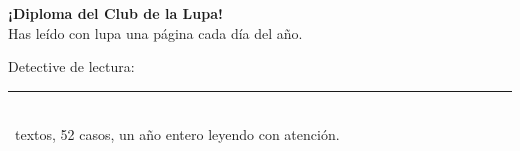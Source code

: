 \begin{center}
\vspace*{2.6cm}

\iconoLupa[0.9]

\vspace{9mm}
{\fontsize{32}{38}\selectfont\bfseries\color{colorLectura} ¡Diploma del Club de la Lupa!}\\[8mm]
{\Large Has leído con lupa una página cada día del año.}\\[10mm]
{\Large Detective de lectura: \rule{65mm}{0.4pt}}\\[14mm]
{\large \totaldias\ textos, 52 casos, un año entero leyendo con atención.}
\end{center}
\vspace*{\fill}
\newpage
